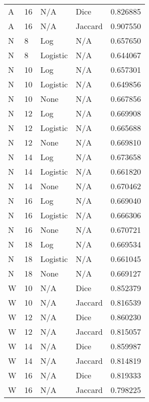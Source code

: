 \documentclass{article}
\begin{document}
\begin{center}
\begin{supertabular}{| l | l | l | l | l |}
            A & 16 & N/A & Dice & 0.826885 \\
            A & 16 & N/A & Jaccard & 0.907550 \\
            N & 8 & Log & N/A & 0.657650 \\
            N & 8 & Logistic & N/A & 0.644067 \\
            N & 10 & Log & N/A & 0.657301 \\
            N & 10 & Logistic & N/A & 0.649856 \\
            N & 10 & None & N/A & 0.667856 \\
            N & 12 & Log & N/A & 0.669908 \\
            N & 12 & Logistic & N/A & 0.665688 \\
            N & 12 & None & N/A & 0.669810 \\
            N & 14 & Log & N/A & 0.673658 \\
            N & 14 & Logistic & N/A & 0.661820 \\
            N & 14 & None & N/A & 0.670462 \\
            N & 16 & Log & N/A & 0.669040 \\
            N & 16 & Logistic & N/A & 0.666306 \\
            N & 16 & None & N/A & 0.670721 \\
            N & 18 & Log & N/A & 0.669534 \\
            N & 18 & Logistic & N/A & 0.661045 \\
            N & 18 & None & N/A & 0.669127 \\
            W & 10 & N/A & Dice & 0.852379 \\
            W & 10 & N/A & Jaccard & 0.816539 \\
            W & 12 & N/A & Dice & 0.860230 \\
            W & 12 & N/A & Jaccard & 0.815057 \\
            W & 14 & N/A & Dice & 0.859987 \\
            W & 14 & N/A & Jaccard & 0.814819 \\
            W & 16 & N/A & Dice & 0.819333 \\
            W & 16 & N/A & Jaccard & 0.798225 \\
         \hline
      \end{supertabular}
\end{center}
\end{document}
